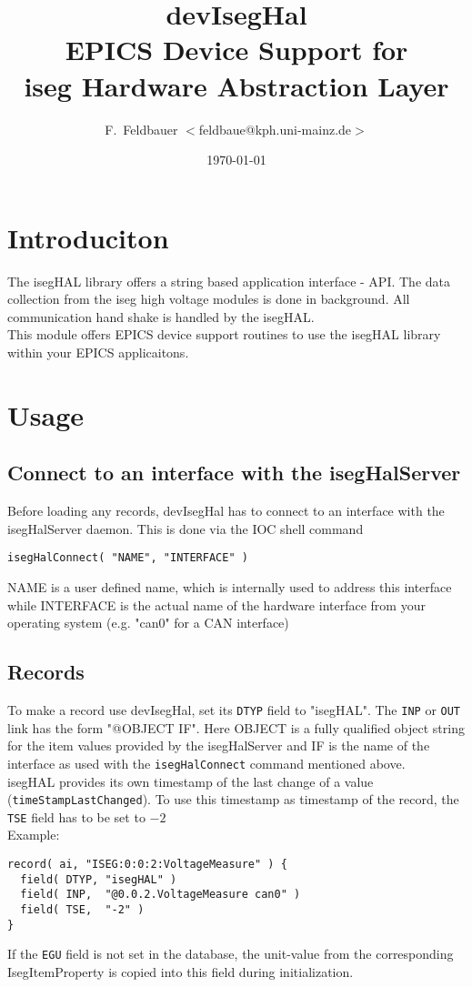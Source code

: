 \documentclass[a4paper,10pt]{scrartcl}
\title{devIsegHal\\EPICS Device Support for\\ iseg Hardware Abstraction Layer}
\author{F.~Feldbauer $<$feldbaue@kph.uni-mainz.de$>$}
\date{\today}
\begin{document}
%
%
\maketitle
\tableofcontents 
%
%
\section{Introduciton}
The isegHAL library offers a string based application interface - API. The data
collection from the iseg high voltage modules is done in background. All
communication hand shake is handled by the isegHAL.\\
This module offers EPICS device support routines to use the isegHAL library
within your EPICS applicaitons.

\section{Usage}
\subsection{Connect to an interface with the isegHalServer}
Before loading any records, devIsegHal has to connect to an interface
with the isegHalServer daemon. This is done via the IOC shell command
\begin{lstlisting}
isegHalConnect( "NAME", "INTERFACE" )
\end{lstlisting}
NAME is a user defined name, which is internally used to address this interface
while INTERFACE is the actual name of the hardware interface from your operating system
(e.g. "can0" for a CAN interface)

\subsection{Records}
To make a record use devIsegHal, set its \lstinline|DTYP| field to "isegHAL".
The \lstinline|INP| or \lstinline|OUT| link has the form "@OBJECT IF".
Here OBJECT is a fully qualified object string for the item values
provided by the isegHalServer and IF is the name of the interface as used with the 
\lstinline|isegHalConnect| command mentioned above.\\
isegHAL provides its own timestamp of the last change of a value (\lstinline|timeStampLastChanged|).
To use this timestamp as timestamp of the record, the \lstinline|TSE| field has to be set to $-2$\\
Example:
\begin{lstlisting}
record( ai, "ISEG:0:0:2:VoltageMeasure" ) {
  field( DTYP, "isegHAL" )
  field( INP,  "@0.0.2.VoltageMeasure can0" )
  field( TSE,  "-2" )
}
\end{lstlisting}
If the \lstinline|EGU| field is not set in the database, the unit-value from the
corresponding IsegItemProperty is copied into this field during initialization.\\
\end{document}
